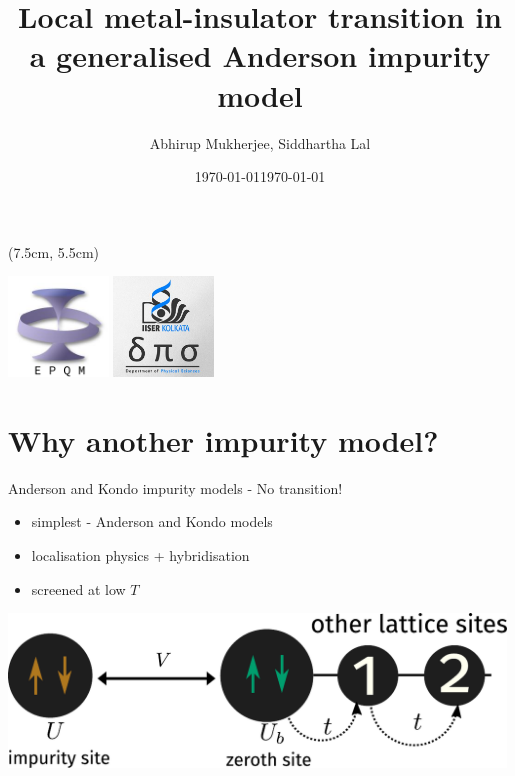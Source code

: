 \documentclass[10pt,aspectratio=169]{beamer}
\title{
{Local metal-insulator transition in a generalised Anderson impurity model}
}
\date{\today}
\author{\large Abhirup Mukherjee, Siddhartha Lal}
\institute{Department of Physical Sciences, IISER Kolkata, Mohanpur}
\date{\large\today}
\begin{document}
\begin{frame}[noframenumbering]
\maketitle
\begin{textblock*}{0.7\textwidth}(7.5cm, 5.5cm)
	\centering
	\vspace*{\fill}

	\hspace*{\fill}
	\includegraphics[width=0.2\textwidth]{figures/epqm_logo_mod.jpeg}
	\includegraphics[width=0.2\textwidth]{figures/dps_logo.jpeg}
	\hspace*{\fill}

	\vspace*{\fill}
\end{textblock*}
\end{frame}

\section{Why another impurity model?}

\begin{frame}[noframenumbering]{Anderson and Kondo impurity models - No transition!}

\hspace*{-20pt}
\begin{minipage}{0.53\textwidth}
\begin{itemize}
	\item simplest - Anderson and Kondo models\\[20pt]
	\item localisation physics + hybridisation\\[20pt]
	\item screened at low \(T\)\\[20pt]
\end{itemize}
\end{minipage}
\begin{minipage}{0.5\textwidth}
\includegraphics[width=0.99\textwidth]{figures/siam.pdf}
\end{minipage}
\end{frame}
\end{document}
